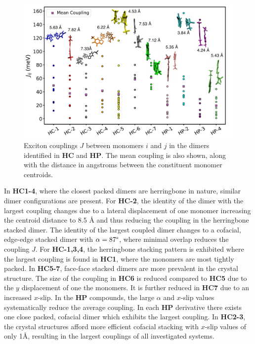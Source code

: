 \begin{figure}[t]
\centering
  \includegraphics[width=0.9\linewidth]{5ConnectingCrystalStructure/couplings}
  \caption[Exciton couplings in \textbf{HC} and \textbf{HP} systems]{Exciton couplings $J$ between monomers $i$ and $j$ in the dimers identified in \textbf{HC} and \textbf{HP}. The mean coupling is also shown, along with the distance in angstroms between the constituent monomer centroids.}
  \label{figure: couplings}
\end{figure}

In \textbf{HC1-4}, where the closest packed dimers are herringbone in nature, similar dimer configurations are present. For \textbf{HC-2}, the identity of the dimer with the largest coupling changes due to a lateral displacement of one monomer increasing the centroid distance to 8.5 {\AA} and thus reducing the coupling in the herringbone stacked dimer. The identity of the largest coupled dimer changes to a cofacial, edge-edge stacked dimer with $\alpha=87\degree$, where minimal overlap reduces the coupling $J$. For \textbf{HC-1,3,4}, the herringbone stacking pattern is exhibited where the largest coupling is found in \textbf{HC1}, where the monomers are most tightly packed. In \textbf{HC5-7}, face-face stacked dimers are more prevalent in the crystal structure. The size of the coupling in \textbf{HC6} is reduced compared to \textbf{HC5} due to the $y$ displacement of one the monomers. It is further reduced in \textbf{HC7} due to an increased $x$-slip. In the \textbf{HP} compounds, the large $\alpha$ and $x$-slip values systematically reduce the average coupling. In each \textbf{HP} derivative there exists one close packed, cofacial dimer which exhibits the largest coupling. In \textbf{HC2-3}, the crystal structures afford more efficient cofacial stacking with $x$-slip values of only 1{\AA}, resulting in the largest couplings of all investigated systems. 

